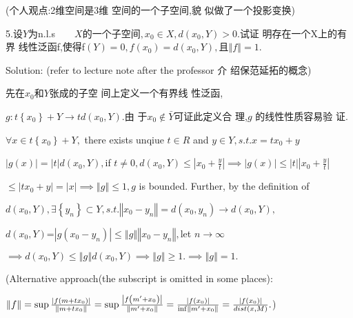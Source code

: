 \documentclass{article}
\begin{document}
(个人观点:2维空间是3维%
空间的一个子空间,貌%
似做了一个投影变换)

\bigskip

5.设$Y$为n.l.s$\qquad X的 一 个 子 
空 间 ,x_{0}\in X,d\left( x_{0},Y\right) >0.$试证%
明存在一个X上的有界%
线性泛函f,使得f$\left( Y\right)
=0,f\left( x_{0}\right) =d\left( x_{0},Y\right) ,$且$\left\Vert
f\right\Vert =1.$

\bigskip Solution: (refer to lecture note after the professor 介%
绍保范延拓的概念)

先在$x_{0}$和$Y$张成的子空%
间上定义一个有界线%
性泛函,

$g:t\left\{ x_{0}\right\} +Y\rightarrow td\left( x_{0},Y\right) .$由%
于$x_{0}\notin \bar{Y}$可证此定义合%
理,$g$ 的线性性质容易验%
证.

\bigskip $\forall x\in t\left\{ x_{0}\right\} +Y,$ there exists unqiue $t\in
R$ and $y\in Y,s.t.x=tx_{0}+y$

$\left\vert g\left( x\right) \right\vert =\left\vert t\right\vert d\left(
x_{0},Y\right) ,$if $t\neq 0,d\left( x_{0},Y\right) \leq \left\vert x_{0}+%
\frac{y}{t}\right\vert \implies \left\vert g\left( x\right) \right\vert \leq
\left\vert t\right\vert \left\vert x_{0}+\frac{y}{t}\right\vert $

$\leq \left\vert tx_{0}+y\right\vert =\left\vert x\right\vert \implies
\left\Vert g\right\Vert \leq 1,g$ is bounded. Further, by the definition of

$d\left( x_{0},Y\right) ,\exists \left\{ y_{n}\right\} \subset
Y,s.t.\left\Vert x_{0}-y_{n}\right\Vert =d\left( x_{0},y_{n}\right)
\rightarrow d\left( x_{0},Y\right) ,$

$d\left( x_{0},Y\right) $=$\left\vert g\left( x_{0}-y_{n}\right) \right\vert
\leq \left\Vert g\right\Vert \left\Vert x_{0}-y_{n}\right\Vert ,$let $%
n\rightarrow \infty $

$\implies d\left( x_{0},Y\right) \leq \left\Vert g\right\Vert d\left(
x_{0},Y\right) \implies \left\Vert g\right\Vert \geq 1.\implies \left\Vert
g\right\Vert =1.$

\bigskip (Alternative approach(the subscript is omitted in some places):

$\left\Vert f\right\Vert =\sup \frac{\left\vert f\left( m+tx_{0}\right)
\right\vert }{\left\Vert m+tx_{0}\right\Vert }=\sup \frac{\left\vert f\left(
m^{\prime }+x_{0}\right) \right\vert }{\left\Vert m^{\prime
}+x_{0}\right\Vert }=\frac{\left\vert f\left( x_{0}\right) \right\vert }{%
\inf \left\Vert m^{\prime }+x_{0}\right\Vert }=\frac{\left\vert f\left(
x_{0}\right) \right\vert }{dist\left( x,M\right) }.$)
\end{document}
